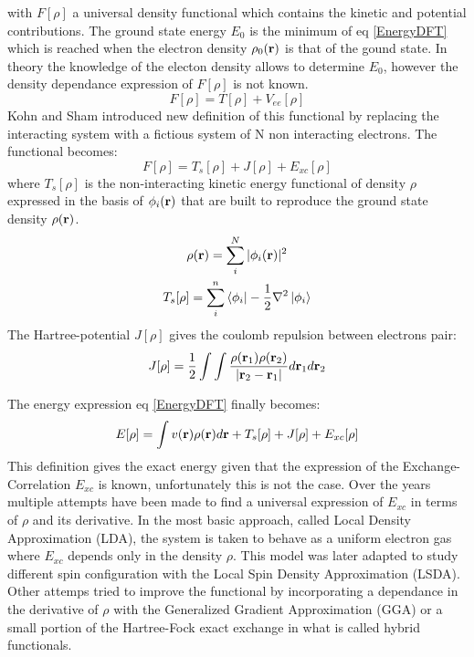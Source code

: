 \documentclass[12pt]{report}
\numberwithin{equation}{section}
\begin{document}
with $F[\rho]$ a universal density functional which contains the kinetic and potential contributions.
The ground state energy $E_0$ is the minimum of eq \ref{EnergyDFT} which is reached when the electron density $\rho_0(\vb r)$ is that of the gound state.
In theory the knowledge of the electon density allows to determine $E_0$, however the density dependance expression of $F[\rho]$ is not known.
\begin{equation}
    F[\rho]=T[\rho]+V_{ee}[\rho]
\end{equation}
Kohn and Sham introduced new definition of this functional by replacing the interacting system with a fictious system of N non interacting electrons.%
The functional becomes:
\begin{equation}
    F[\rho]=T_s[\rho]+J[\rho]+E_{xc}[\rho]
\end{equation}
where $T_s[\rho]$ is the non-interacting kinetic energy functional of density $\rho$ expressed in the basis of $\phi_i (\vb r)$ that are built to reproduce the ground state density $\rho(\vb r)$.
\begin{gather}
    \rho(\vb r) = \sum_{i}^{N} |\phi_i (\vb r)|^2\\
    T_s[\rho]=\sum_{i}^{n} \bra{\phi_i} -\frac{1}{2}\nabla^2 \ket{\phi_i}
\end{gather}
The Hartree-potential $J[\rho]$ gives the coulomb repulsion between electrons pair:
\begin{equation}
    J[\rho]=\frac{1}{2}\int\int \frac{\rho(\vb r_1) \rho(\vb r_2)}{|\vb r_2 - \vb r_1 |} d\vb r_1 d\vb r_2
\end{equation}

The energy expression eq \ref{EnergyDFT} finally becomes:
\begin{equation}
    E[\rho]= \int v(\vb r) \rho(\vb r) d\vb r + T_s[\rho] + J[\rho]+ E_{xc}[\rho]
\end{equation}
This definition gives the exact energy given that the expression of the Exchange-Correlation $E_{xc}$ is known, unfortunately this is not the case. 
Over the years multiple attempts have been made to find a universal expression of $E_{xc}$ in terms of $\rho$ and its derivative. 
In the most basic approach, called Local Density Approximation (LDA), the system is taken to behave as a uniform electron gas where $E_{xc}$ depends only in the density $\rho$. 
This model was later adapted to study different spin configuration with the Local Spin Density Approximation (LSDA).
Other attemps tried to improve the functional by incorporating a dependance in the derivative of $\rho$ with the Generalized Gradient Approximation (GGA) or a small portion of the Hartree-Fock exact exchange in what is called hybrid functionals.
\end{document}
